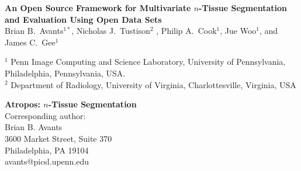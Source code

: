 \documentclass[11pt,english]{article}
\begin{document}
\normalem

\vspace*{5cm}

\begin{center}
{\Large \bf An Open Source Framework for Multivariate $n$-Tissue
  Segmentation and Evaluation Using Open Data Sets} \\
\vspace*{0.5cm}
{\normalsize Brian B.~Avants$^{1*}$,  Nicholas J.~Tustison$^2$%
, 
Philip A.~Cook$^1$, Jue Woo$^1$, and James C.~Gee$^1$} \\
\begin{singlespace} 
{\scriptsize  $^1$ Penn Image Computing and Science Laboratory, University of Pennsylvania, Philadelphia, Pennsylvania,  USA.\\
  $^2$ Department of Radiology, University of Virginia, Charlottesville, Virginia, USA}
\end{singlespace}
\end{center}

\vfill

\begin{singlespace} 
\scriptsize
\flushleft
{\bf Atropos:  $n$-Tissue Segmentation}\\
Corresponding author: \\
Brian B. Avants\\
3600 Market Street, Suite 370\\
Philadelphia, PA  19104\\
avants@picsl.upenn.edu\\
\end{singlespace} 

%
%

\clearpage
\end{document}
